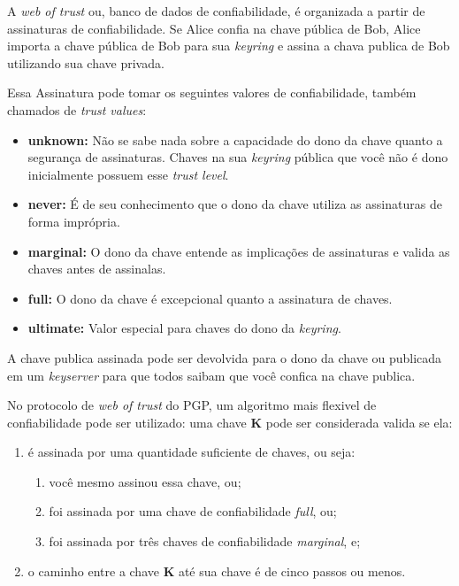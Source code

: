 \documentclass[12pt, letterpaper]{article}
\begin{document}
A \textit{web of trust} ou, banco de dados de confiabilidade,
é organizada a partir de assinaturas de confiabilidade.
Se Alice confia na chave pública de Bob, Alice importa
a chave pública de Bob para sua \textit{keyring} e
assina a chava publica de Bob utilizando sua chave privada.

Essa Assinatura pode tomar os seguintes valores de confiabilidade,
também chamados de \textit{trust values}:
\begin{itemize}
  \item \textbf{unknown:}
    Não se sabe nada sobre a capacidade do dono da chave quanto a segurança de assinaturas.
    Chaves na sua \textit{keyring} pública que você não é dono inicialmente possuem esse \textit{trust level}.
  \item \textbf{never:}
    É de seu conhecimento que o dono da chave utiliza as assinaturas de forma imprópria.
  \item \textbf{marginal:}
    O dono da chave entende as implicações de assinaturas e valida as chaves antes de assinalas.
  \item \textbf{full:}
    O dono da chave é excepcional quanto a assinatura de chaves.
  \item \textbf{ultimate:}
    Valor especial para chaves do dono da \textit{keyring}.
\end{itemize}

A chave publica assinada pode ser devolvida para o dono da chave ou publicada em um
\textit{keyserver} para que todos saibam que você confica na chave publica.

No protocolo de \textit{web of trust} do PGP, um algoritmo mais flexivel de confiabilidade pode ser utilizado:
uma chave \textbf{K} pode ser considerada valida se ela:
\begin{enumerate}
    \item é assinada por uma quantidade suficiente de chaves, ou seja:
      \begin{enumerate}
          \item você mesmo assinou essa chave, ou;
          \item foi assinada por uma chave de confiabilidade \textit{full}, ou;
          \item foi assinada por três chaves de confiabilidade \textit{marginal}, e;
      \end{enumerate}
    \item o caminho entre a chave \textbf{K} até sua chave é de
      cinco passos ou menos.
\end{enumerate}
\end{document}
